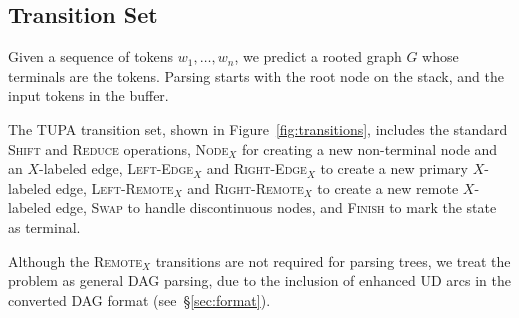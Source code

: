 \documentclass[11pt,a4paper]{article}
\begin{document}
\subsection{Transition Set}\label{sec:transition_set}
Given a sequence of tokens $w_1, \ldots, w_n$,
we predict a rooted graph $G$ whose terminals are the tokens.
Parsing starts with the root node on the stack,
and the input tokens in the buffer.

The TUPA transition set, shown in Figure~\ref{fig:transitions}, includes
the standard \textsc{Shift} and \textsc{Reduce} operations,
\textsc{Node$_X$} for creating a new non-terminal node and an $X$-labeled edge,
\textsc{Left-Edge$_X$} and \textsc{Right-Edge$_X$} to create a new primary $X$-labeled edge,
\textsc{Left-Remote$_X$} and \textsc{Right-Remote$_X$} to create a new remote $X$-labeled edge,
\textsc{Swap} to handle discontinuous nodes,
and \textsc{Finish} to mark the state as terminal.

Although the \textsc{Remote$_X$} transitions are not required for parsing trees,
we treat the problem as general DAG parsing, due to the inclusion of enhanced UD arcs
in the converted DAG format (see~\S\ref{sec:format}).
\end{document}
